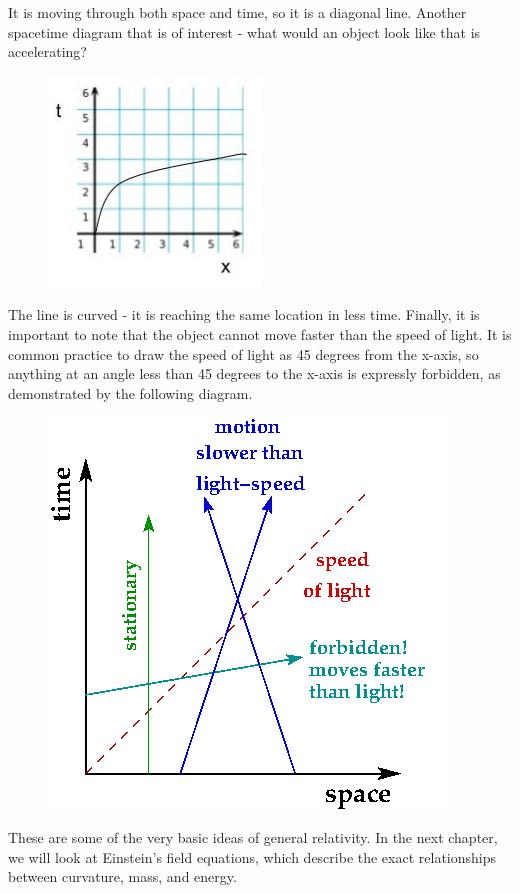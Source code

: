 It is moving through both space and time, so it is a diagonal line. Another spacetime diagram that is of interest - what would an object
look like that is accelerating?
\begin{figure}[H]
\includegraphics[scale=0.5]{acceler.jpg}
\end{figure}
The line is curved - it is reaching the same location in less time. Finally, it is important to note that the object cannot move
faster than the speed of light. It is common practice to draw the speed of light as 45 degrees from the x-axis, so anything at an
angle less than 45 degrees to the x-axis is expressly forbidden, as demonstrated by the following diagram.
\begin{figure}[H]
\includegraphics[scale=0.5]{light.png}
\end{figure}
These are some of the very basic ideas of general relativity. In the next chapter, we will look at Einstein's field equations, which describe the exact relationships between curvature, mass, and energy.